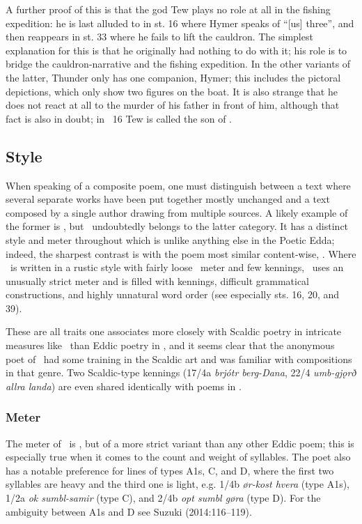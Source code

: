 A further proof of this is that the god Tew plays no role at all in the fishing expedition: he is last alluded to in st. 16 where Hymer speaks of “[us] three”, and then reappears in st. 33 where he fails to lift the cauldron.  The simplest explanation for this is that he originally had nothing to do with it; his role is to bridge the cauldron-narrative and the fishing expedition.  In the other variants of the latter, Thunder only has one companion, Hymer; this includes the pictoral depictions, which only show two figures on the boat.  It is also strange that he does not react at all to the murder of his father in front of him, although that fact is also in doubt; in \Skaldskaparmal\ 16 Tew is called the son of .

\subsection{Style}

When speaking of a composite poem, one must distinguish between a text where several separate works have been put together mostly unchanged and a text composed by a single author drawing from multiple sources.  A likely example of the former is \Havamal, but \Hymiskvida\ undoubtedly belongs to the latter category.  It has a distinct style and meter throughout which is unlike anything else in the Poetic Edda; indeed, the sharpest contrast is with the poem most similar content-wise, \Thrymskvida.  Where \Thrymskvida\ is written in a rustic style with fairly loose \Fornyrdislag\ meter and few kennings, \Hymiskvida\ uses an unusually strict meter and is filled with kennings, difficult grammatical constructions, and highly unnatural word order (see especially sts. 16, 20, and 39).

These are all traits one associates more closely with Scaldic poetry in intricate measures like \Drottkvett\ than Eddic poetry in \Fornyrdislag, and it seems clear that the anonymous poet of \Hymiskvida\ had some training in the Scaldic art and was familiar with compositions in that genre.  Two Scaldic-type kennings (17/4a \emph{brjótr berg-Dana}, 22/4 \emph{umb-gjǫrð allra landa}) are even shared identically with poems in \Drottkvett.

\subsubsection{Meter}

The meter of \Hymiskvida\ is \Fornyrdislag, but of a more strict variant than any other Eddic poem; this is especially true when it comes to the count and weight of syllables.  The poet also has a notable preference for lines of types A1s, C, and D, where the first two syllables are heavy and the third one is light, e.g. 1/4b \emph{ør-kost hvera} (type A1s), 1/2a \emph{ok sumbl-samir} (type C), and 2/4b \emph{opt sumbl gøra} (type D).  For the ambiguity between A1s and D see Suzuki (2014:116--119).

